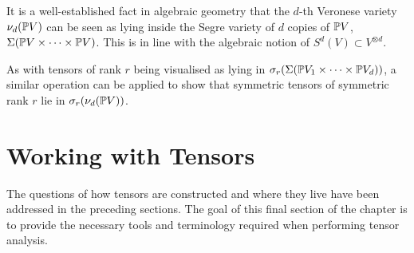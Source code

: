 \documentclass[../Lael_John_MasterThesis_Draft.tex]{subfiles}
\begin{document}
\begin{remark}
    It is a well-established fact in algebraic geometry that the $d$-th Veronese variety $\nu_d(\mathbb{P} V)$ can be seen as lying inside the Segre variety of $d$ copies of $\mathbb{P} V$, $\Sigma(\mathbb{P} V \times \cdots \times \mathbb{P} V)$. This is in line with the algebraic notion of $S^d(V) \subset V^{\otimes d}$.
\end{remark}
\begin{remark}
    As with tensors of rank $r$ being visualised as lying in $\sigma_r(\Sigma(\mathbb{P} V_1 \times \cdots \times \mathbb{P} V_d))$, a similar operation can be applied to show that symmetric tensors of symmetric rank $r$ lie in $\sigma_r(\nu_d(\mathbb{P} V))$.
\end{remark}

\section{Working with Tensors}
The questions of how tensors are constructed and where they live have been addressed in the preceding sections. The goal of this final section of the chapter is to provide the necessary tools and terminology required when performing tensor analysis.
\end{document}
